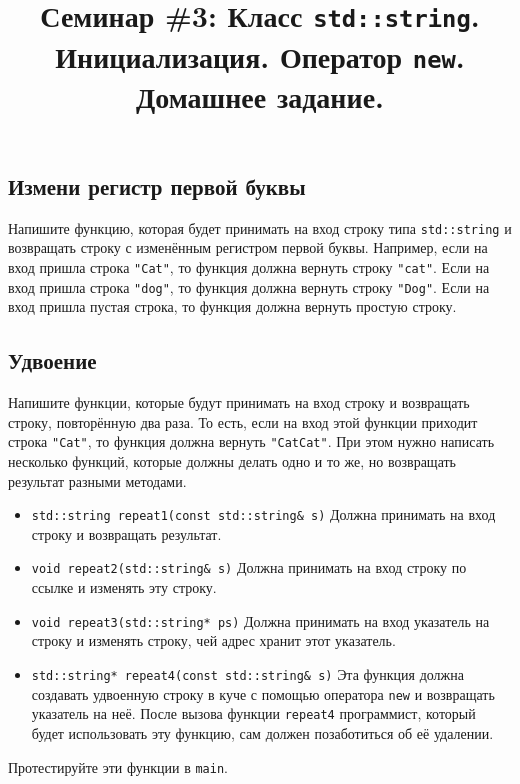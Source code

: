 \documentclass{article}
\begin{document}
\title{Семинар \#3: Класс \texttt{std::string}. Инициализация. Оператор \texttt{new}. Домашнее задание.\vspace{-5ex}}\date{}\maketitle

\subsection{Измени регистр первой буквы}
Напишите функцию, которая будет принимать на вход строку типа \texttt{std::string} и возвращать строку с изменённым регистром первой буквы. Например, если на вход пришла строка \texttt{"Cat"}, то функция должна вернуть строку \texttt{"cat"}. Если на вход пришла строка \texttt{"dog"}, то функция должна вернуть строку \texttt{"Dog"}. Если на вход пришла пустая строка, то функция должна вернуть простую строку.


\subsection{Удвоение}
Напишите функции, которые будут принимать на вход строку и возвращать строку, повторённую два раза. То есть, если на вход этой функции приходит строка \texttt{"Cat"}, то функция должна вернуть \texttt{"CatCat"}.
При этом нужно написать несколько функций, которые должны делать одно и то же, но возвращать результат разными методами.
\begin{itemize}
\item \texttt{std::string repeat1(const std::string\& s)}
Должна принимать на вход строку и возвращать результат.
\item \texttt{void repeat2(std::string\& s)}
Должна принимать на вход строку по ссылке и изменять эту строку.
\item \texttt{void repeat3(std::string* ps)}
Должна принимать на вход указатель на строку и изменять строку, чей адрес хранит этот указатель.
\item \texttt{std::string* repeat4(const std::string\& s)}
Эта функция должна создавать удвоенную строку в куче с помощью оператора \texttt{new} и возвращать указатель на неё. После вызова функции \texttt{repeat4} программист, который будет использовать эту функцию, сам должен позаботиться об её удалении.
\end{itemize}

Протестируйте эти функции в \texttt{main}.
\end{document}
